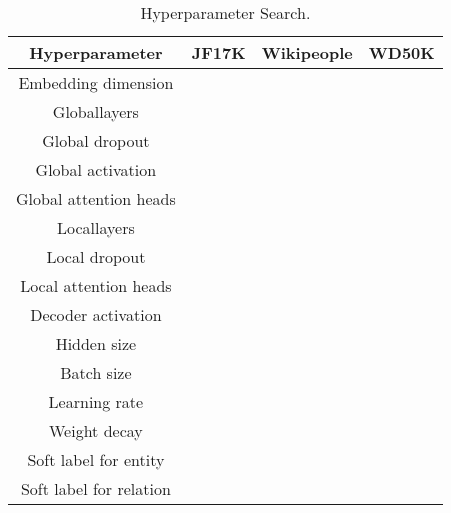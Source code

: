 \documentclass[11pt]{article}
\begin{document}
\begin{table*}[h!t]
\scriptsize
\centering
\begin{tabular}{rrrr}
\toprule
\multicolumn{1}{c}{\textbf{Hyperparameter}} & \multicolumn{1}{c}{\textbf{JF17K}}& \multicolumn{1}{c}{\textbf{Wikipeople}}& \multicolumn{1}{c}{\textbf{WD50K}}\\
\midrule
\multicolumn{1}{c}{Embedding dimension} & \multicolumn{1}{c}{}& \multicolumn{1}{c}{}& \multicolumn{1}{c}{}\\
\multicolumn{1}{c}{Global\underline{\space}layers} & \multicolumn{1}{c}{}& \multicolumn{1}{c}{}& \multicolumn{1}{c}{}\\
\multicolumn{1}{c}{Global dropout} & \multicolumn{1}{c}{}& \multicolumn{1}{c}{}& \multicolumn{1}{c}{}\\
\multicolumn{1}{c}{Global activation} & \multicolumn{1}{c}{}& \multicolumn{1}{c}{}& \multicolumn{1}{c}{}\\
\multicolumn{1}{c}{Global attention heads} & \multicolumn{1}{c}{}& \multicolumn{1}{c}{}& \multicolumn{1}{c}{}\\
\multicolumn{1}{c}{Local\underline{\space}layers} & \multicolumn{1}{c}{}& \multicolumn{1}{c}{}& \multicolumn{1}{c}{}\\
\multicolumn{1}{c}{Local dropout} & \multicolumn{1}{c}{}& \multicolumn{1}{c}{}& \multicolumn{1}{c}{}\\
\multicolumn{1}{c}{Local attention heads} & \multicolumn{1}{c}{}& \multicolumn{1}{c}{}& \multicolumn{1}{c}{}\\
\multicolumn{1}{c}{Decoder activation} & \multicolumn{1}{c}{}& \multicolumn{1}{c}{}& \multicolumn{1}{c}{}\\
\multicolumn{1}{c}{Hidden size} & \multicolumn{1}{c}{}& \multicolumn{1}{c}{}& \multicolumn{1}{c}{}\\
\multicolumn{1}{c}{Batch size} & \multicolumn{1}{c}{}& \multicolumn{1}{c}{}& \multicolumn{1}{c}{}\\
\multicolumn{1}{c}{Learning rate} & \multicolumn{1}{c}{}& \multicolumn{1}{c}{}& \multicolumn{1}{c}{}\\
\multicolumn{1}{c}{Weight decay} & \multicolumn{1}{c}{}& \multicolumn{1}{c}{}& \multicolumn{1}{c}{}\\
\multicolumn{1}{c}{Soft label for entity} & \multicolumn{1}{c}{}& \multicolumn{1}{c}{}& \multicolumn{1}{c}{}\\
\multicolumn{1}{c}{Soft label for relation} & \multicolumn{1}{c}{}& \multicolumn{1}{c}{}& \multicolumn{1}{c}{}\\
\bottomrule   
\end{tabular}

\caption{\label{t6}
Hyperparameter Search.
}

\end{table*}
\end{document}
